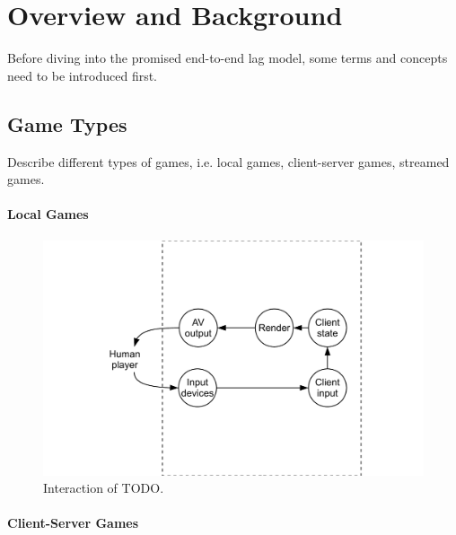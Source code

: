 \section{Overview and Background}
\label{sec:background}

Before diving into the promised end-to-end lag model, some terms and concepts need to be introduced first.


\subsection{Game Types}
Describe different types of games, i.e. local games, client-server games, streamed games.


\paragraph*{Local Games}

\begin{figure}
  \centering
  \includegraphics[width=0.8\columnwidth]{../models/component_interaction-local.pdf}
  \caption{Interaction of TODO.}
  \label{fig:component-model-local}
\end{figure}

\paragraph*{Client-Server Games}

